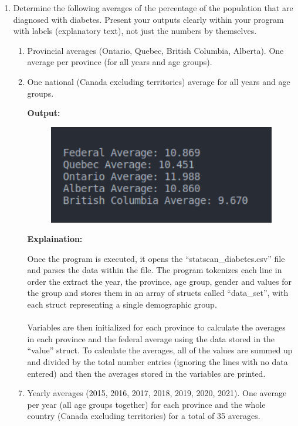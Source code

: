 

\begin{enumerate}
	\item {Determine the following averages of the percentage of the population that are diagnosed with diabetes. Present your outputs clearly within your program with labels (explanatory text), not just the numbers by themselves. }
	\begin{enumerate}
		\item {Provincial averages (Ontario, Quebec, British Columbia, Alberta). One average per province (for all years and age groups).}
		\item {One national (Canada excluding territories) average for all years and age groups.}
		\item[\textbf{Output:}]
		\item[] {\begin{figure}[H]
			\includegraphics[width=12.75cm]{q1_ab.png}
		\end{figure}}
		\item[\textbf{Explaination:}]
		\item[] {{Once the program is executed, it opens the “statscan\_diabetes.csv” file and parses the data within the file. The program tokenizes each line in order the extract the year, the province, age group, gender and values for the group and stores them in an array of structs called “data\_set”, with each struct representing a single demographic group.} 
\\ \\
{Variables are then initialized for each province to calculate the averages in each province and the federal average using the data stored in the “value” struct. To calculate the averages, all of the values are summed up and divided by the total number entries (ignoring the lines with no data entered) and then the averages stored in the variables are printed.}}
		\item {Yearly averages (2015, 2016, 2017, 2018, 2019, 2020, 2021). One average per year (all age groups together) for each province and the whole country (Canada excluding territories) for a total of 35 averages.}

\end{enumerate}
\end{enumerate}
